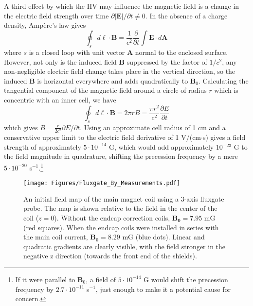 \documentclass [10pt, twoside] {uwthesis}[2012/04/02]
\begin{document}
A third effect by which the HV may influence the magnetic field is a change in the electric field strength over time $\partial|\mathbf{E}|/\partial t \neq 0$. In the absence of a charge density, Amp\`{e}re's law gives \cite{Jackson}
\begin{equation}
\oint_s d\ell \cdot \mathbf{B} = \dfrac{1}{c^2}\dfrac{\partial}{\partial t} \int \mathbf{E} \cdot d\mathbf{A}
\end{equation}
where $s$ is a closed loop with unit vector $\mathbf{A}$ normal to the enclosed surface. However, not only is the induced field $\mathbf{B}$ suppressed by the factor of $1/c^2$, any non-negligible electric field change takes place in the vertical direction, so the induced $\mathbf{B}$ is horizontal everywhere and adds quadratically to $\mathbf{B}_0$. Calculating the tangential component of the magnetic field around a circle of radius $r$ which is concentric with an inner cell, we have 
\begin{equation}
\oint_s d\ell \cdot \mathbf{B} = 2\pi r B = \dfrac{\pi r^2}{c^2} \dfrac{\partial E}{\partial t}
\end{equation} 
which gives $B = \frac{r}{2c^2} \partial E/\partial t$. Using an approximate cell radius of 1 cm and a conservative upper limit to the electric field derivative of 1 V/(cm$\cdot$s) gives a field strength of approximately $5 \cdot 10^{-14}$ G, which would add approximately 10$^{-23}$ G to the field magnitude in quadrature, shifting the precession frequency by a mere $5 \cdot 10^{-20}$ s$^{-1}$.\footnote{If it were parallel to $\mathbf{B}_0$, a field of $5 \cdot 10^{-14}$ G would shift the precession frequency by $2.7 \cdot 10^{-11}$ s$^{-1}$, just enough to make it a potential cause for concern.} 

\begin{figure}
\begin{center}
\texttt{[image: Figures/Fluxgate\_By\_Measurements.pdf]}
\end{center}
\caption[Field map of $\mathbf{B_y}(z)$]%
{\narrower An initial field map of the main magnet coil using a 3-axis fluxgate probe. The map is shown relative to the field in the center of the coil ($z=0$). Without the endcap correction coils, $\mathbf{B_0} = 7.95$ mG (red squares). When the endcap coils were installed in series with the main coil current, $\mathbf{B_0} = 8.29$ mG (blue dots). Linear and quadratic gradients are clearly visible, with the field stronger in the negative z direction (towards the front end of the shields).}
\label{ByMap2010}
\end{figure}
\end{document}
